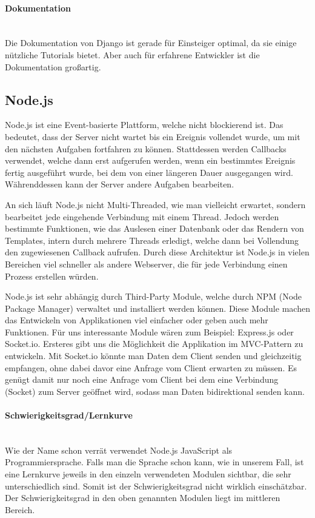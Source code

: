 \documentclass[11pt]{article}
\begin{document}
\paragraph{Dokumentation} \mbox{}\\
Die Dokumentation von Django ist gerade f\"ur Einsteiger optimal, da sie einige n\"utzliche Tutorials bietet. Aber auch f\"ur erfahrene Entwickler ist die Dokumentation gro{\ss}artig.
\newpage

\subsection{Node.js}
Node.js ist eine Event-basierte Plattform, welche nicht blockierend ist. Das bedeutet, dass der Server nicht wartet bis ein Ereignis vollendet wurde, um mit den n\"achsten Aufgaben fortfahren zu k\"onnen. Stattdessen werden Callbacks verwendet, welche dann erst aufgerufen werden, wenn ein bestimmtes Ereignis fertig ausgef\"uhrt wurde, bei dem von einer l\"angeren Dauer ausgegangen wird. W\"ahrenddessen kann der Server andere Aufgaben bearbeiten.

An sich l\"auft Node.js nicht Multi-Threaded, wie man vielleicht erwartet, sondern bearbeitet jede eingehende Verbindung mit einem Thread. Jedoch werden bestimmte Funktionen, wie das Auslesen einer Datenbank oder das Rendern von Templates, intern durch mehrere Threads erledigt, welche dann bei Vollendung den zugewiesenen Callback aufrufen. Durch diese Architektur ist Node.js in vielen Bereichen viel schneller als andere Webserver, die f\"ur jede Verbindung einen Prozess erstellen w\"urden.

Node.js ist sehr abh\"angig durch Third-Party Module, welche durch NPM (Node Package Manager) verwaltet und installiert werden k\"onnen. Diese Module machen das Entwickeln von Applikationen viel einfacher oder geben auch mehr Funktionen. F\"ur uns interessante Module w\"aren zum Beispiel: Express.js oder Socket.io. Ersteres gibt uns die M\"oglichkeit die Applikation im MVC-Pattern zu entwickeln.
Mit Socket.io k\"onnte man Daten dem Client senden und gleichzeitig empfangen, ohne dabei davor eine Anfrage vom Client erwarten zu m\"ussen. Es gen\"ugt damit nur noch eine Anfrage vom Client bei dem eine Verbindung (Socket) zum Server ge\"offnet wird, sodass man Daten bidirektional senden kann.

\paragraph{Schwierigkeitsgrad/Lernkurve} \mbox{}\\
Wie der Name schon verr\"at verwendet Node.js JavaScript als Programmiersprache. Falls man die Sprache schon kann, wie in unserem Fall, ist eine Lernkurve jeweils in den einzeln verwendeten Modulen sichtbar, die sehr unterschiedlich sind. Somit ist der Schwierigkeitsgrad nicht wirklich einsch\"atzbar. Der Schwierigkeitsgrad in den oben genannten Modulen liegt im mittleren Bereich.
\end{document}
